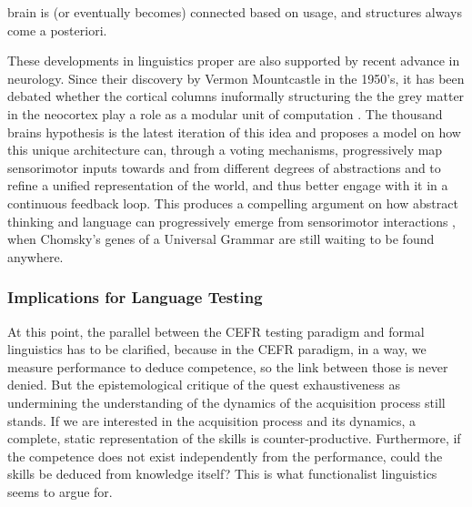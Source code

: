 brain is (or eventually becomes) connected based on usage, and structures always come a posteriori.

These developments in linguistics proper are also supported by recent advance in neurology. Since their discovery by Vermon Mountcastle in the 1950's, it has been debated whether the cortical columns inuformally structuring the the grey matter in the neocortex play a role as a modular unit of computation \parencite{horton_cortical_2005}. The thousand brains hypothesis \parencite{hawkins_theory_2017, hawkins_thousand_2021} is the latest iteration of this idea and proposes a model on how this unique architecture can, through a voting mechanisms, progressively map sensorimotor inputs towards and from different degrees of abstractions and to refine a unified representation of the world, and thus better engage with it in a continuous feedback loop. This produces a compelling argument on how abstract thinking and language can progressively emerge from sensorimotor interactions \parencite{constantinescu_organizing_2016}, when Chomsky's genes of a Universal Grammar are still waiting to be found anywhere.

        \subsubsection{Implications for Language Testing}
At this point, the parallel between the CEFR testing paradigm and formal linguistics has to be clarified, because in the CEFR paradigm, in a way, we measure performance to deduce competence, so the link between those is never denied. But the epistemological critique of the quest exhaustiveness as undermining the understanding of the dynamics of the acquisition process still stands. If we are interested in the acquisition process and its dynamics, a complete, static representation of the skills is counter-productive. Furthermore, if the competence does not exist independently from the performance, could the skills be deduced from knowledge itself? This is what functionalist linguistics seems to argue for.

